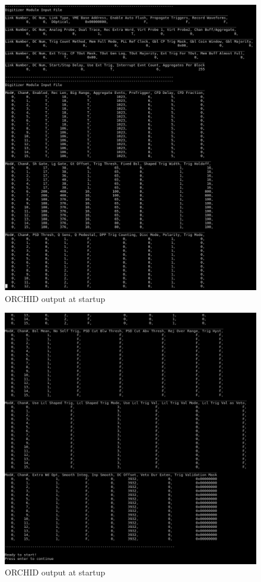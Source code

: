 \documentclass[onecolumn, 10pt, letterpaper, twoside]{article}
\begin{document}
\begin{figure}[h!]
\begin{center}
\includegraphics[width=\textwidth]{./img/Start_Screen_4.png}
\caption{ORCHID output at startup}
\label{fig:ORCHID_Startup4}
\end{center}
\end{figure}
\begin{figure}[h!]
\begin{center}
\includegraphics[width=\textwidth]{./img/Start_Screen_5.png}
\caption{ORCHID output at startup}
\label{fig:ORCHID_Startup5}
\end{center}
\end{figure}
\end{document}

